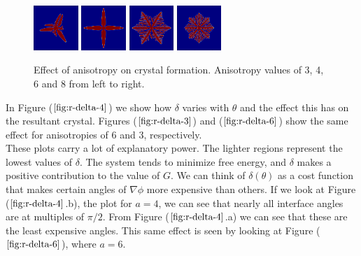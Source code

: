 \documentclass[10pt]{article} %
\begin{document}
\begin{figure}[h!]
  \centering
  \includegraphics[width=0.15\textwidth]{../A-3-17.png}
  \includegraphics[width=0.15\textwidth]{../A-4-17.png}
  \includegraphics[width=0.15\textwidth]{../A-6-17.png}
  \includegraphics[width=0.15\textwidth]{../A-8-17.png}
  \caption{Effect of anisotropy on crystal formation. Anisotropy values of 3, 4, 6 and 8 from left to right.}
  \label{fig:anisotropy}
\end{figure}

In Figure ($\ref{fig:r-delta-4}$) we show how $\delta$ varies with $\theta$ and the effect this has on the resultant crystal. Figures ($\ref{fig:r-delta-3}$) and ($\ref{fig:r-delta-6}$) show the same effect for anisotropies of $6$ and $3$, respectively.\\

These plots carry a lot of explanatory power. The lighter regions represent the lowest values of $\delta$. The system tends to minimize free energy, and $\delta$ makes a positive contribution to the value of $G$. We can think of $\delta(\theta)$ as a cost function that makes certain angles of $\nabla\phi$ more expensive than others. If we look at Figure ($\ref{fig:r-delta-4}$.b), the plot for $a=4$, we can see that nearly all interface angles are at multiples of $\pi/2$. From Figure ($\ref{fig:r-delta-4}$.a) we can see that these are the least expensive angles. This same effect is seen by looking at Figure ($\ref{fig:r-delta-6}$), where $a=6$.\\
\end{document}
